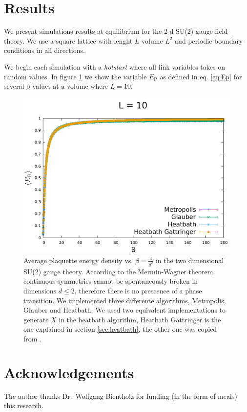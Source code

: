 \documentclass[12pt,a4paper]{article}
\begin{document}
\section{Results}

We present simulations results at equilibrium for the 2-d SU(2) gauge field theory. We use a square lattice with lenght $L$ volume $L^2$ and periodic boundary conditions in all directions.


We begin each simulation with a \textit{hotstart} where all link variables takes on random values.
In figure \ref{fig:L=10} we show the variable $E_{\text{P}}$ as defined in eq. \eqref{eq:Ep} for several $\beta$-values at a volume where $L=10$.

\begin{figure}
	\label{fig:L=10}
	\includegraphics[scale=0.6]{../images/L=10_metropolis_glauber_heatbaths_2000points.pdf}
	\caption{Average plaquette energy density vs. $\beta = \frac{4}{g^2}$ in the two dimensional SU(2) gauge theory. According to the Mermin-Wagner theorem, continuous symmetries cannot be spontaneously broken in dimensions $d\leq 2$, therefore there is no prescence of a phase transition. We implemented three differente algorithms, Metropolis, Glauber and Heatbath. We used two equivalent implementations to generate $X$ in the heatbath algorithm, Heatbath Gattringer is the one explained in section \ref{sec:heatbath}, the other one was copied from \cite{ricker}.}
\end{figure}


\section{Acknowledgements}
The author thanks Dr.\ Wolfgang Bientholz for funding (in the form of meals) this research.
\end{document}
